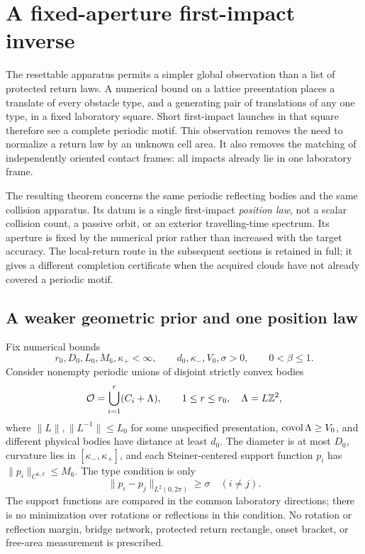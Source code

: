 \section{A fixed-aperture first-impact inverse}
\label{sec:aperture}
The resettable apparatus permits a simpler global observation than a list
of protected return laws. A numerical bound on a lattice presentation
places a translate of every obstacle type, and a generating pair of
translations of any one type, in a fixed laboratory square. Short
first-impact launches in that square therefore see a complete periodic
motif. This observation removes the need to normalize a return law by an
unknown cell area. It also removes the matching of independently oriented
contact frames: all impacts already lie in one laboratory frame.

The resulting theorem concerns the same periodic reflecting bodies and
the same collision apparatus. Its datum is a single first-impact
\emph{position law}, not a scalar collision count, a passive orbit, or an
exterior travelling-time spectrum. Its aperture is fixed by the numerical
prior rather than increased with the target accuracy. The local-return
route in the subsequent sections is retained in full; it gives a different
completion certificate when the acquired clouds have not already covered
a periodic motif.

\subsection{A weaker geometric prior and one position law}
\begin{definition}
\label{def:aperture-prior}
Fix numerical bounds
\[
 r_0,D_0,L_0,M_6,\kappa_+<\infty,\qquad
 d_0,\kappa_-,V_0,\sigma>0,\qquad 0<\beta\le1.
\]
Consider nonempty periodic unions of disjoint strictly convex bodies
\[
 \mathcal O=\bigcup_{i=1}^r(C_i+\Lambda),\qquad
 1\le r\le r_0,\quad \Lambda=L\mathbb Z^2,
\]
where $\|L\|,\|L^{-1}\|\le L_0$ for some unspecified presentation,
$\operatorname{covol}\Lambda\ge V_0$, and different physical bodies have distance
at least $d_0$. The diameter is at most $D_0$, curvature lies in
$[\kappa_-,\kappa_+]$, and each Steiner-centered support function $p_i$
has $\|p_i\|_{C^{6,\beta}}\le M_6$. The type condition is only
\begin{equation}\label{eq:aperture-type}
                   \|p_i-p_j\|_{L^2(0,2\pi)}\ge\sigma\quad(i\ne j).
\end{equation}
The support functions are compared in the common laboratory directions;
there is no minimization over rotations or reflections in this condition.
No rotation or reflection margin, bridge network, protected return
rectangle, onset bracket, or free-area measurement is prescribed.
\end{definition}

